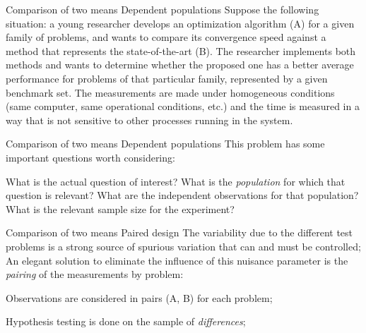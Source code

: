 \documentclass[t]{beamer}
\begin{document}

\begin{ftst}
{Comparison of two means}
{Dependent populations}
Suppose the following situation: a young researcher develops an optimization algorithm (A) for a given family of problems, and wants to compare its convergence speed against a method that represents the state-of-the-art (B).
\vone
The researcher implements both methods and wants to determine whether the proposed one has a better average performance for problems of that particular family, represented by a given benchmark set.
\vone
The measurements are made under homogeneous conditions (same computer, same operational conditions, etc.) and the time is measured in a way that is not sensitive to other processes running in the system.
\vone
{}
\end{ftst}


\begin{ftst}
{Comparison of two means}
{Dependent populations}
This problem has some important questions worth considering:

\bitems What is the actual question of interest?
\spitem What is the \textit{population} for which that question is relevant?
\spitem What are the independent observations for that population?
\spitem What is the relevant sample size for the experiment?
\eitem
\end{ftst}


\begin{ftst}
{Comparison of two means}
{Paired design}
The variability due to the different test problems is a strong source of spurious variation that can and must be controlled;
\vone
An elegant solution to eliminate the influence of this nuisance parameter is the \textit{pairing} of the measurements by problem:

\bitems Observations are considered in pairs (A, B) for each problem; 
\item Hypothesis testing is done on the sample of \textit{differences};
\eitem
\end{ftst}
\end{document}
